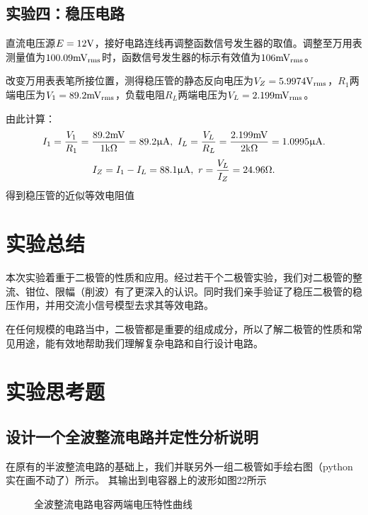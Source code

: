 \documentclass[a4paper,11pt,UTF8]{ctexart}
\begin{document}
	\subsection{实验四：稳压电路}
	直流电压源$E=12\mathrm{V}$，接好电路连线再调整函数信号发生器的取值。调整至万用表测量值为$100.09\mathrm{mV_{rms}}$时，函数信号发生器的标示有效值为$106\mathrm{mV_{rms}}$。
	\par 改变万用表表笔所接位置，测得稳压管的静态反向电压为$V_Z=5.9974\mathrm{V_{rms}}$，$R_1$两端电压为$V_1=89.2\mathrm{mV_{rms}}$，负载电阻$R_L$两端电压为$V_L=2.199\mathrm{mV_{rms}}$。
	\par 由此计算：
	\[ I_1=\frac{V_1}{R_1}=\frac{89.2\mathrm{mV}}{1\mathrm{k}\Omega}=89.2\mathrm{\upmu A},~
	I_L=\frac{V_L}{R_L}=\frac{2.199\mathrm{mV}}{2\mathrm{k}\Omega}=1.0995\mathrm{\upmu A}.
	\]
	\[
	I_Z=I_1-I_L=88.1\mathrm{\upmu A},~r=\frac{V_L}{I_Z}=24.96\Omega.
	\]
	得到稳压管的近似等效电阻值
	
	\section{实验总结}
	本次实验着重于二极管的性质和应用。经过若干个二极管实验，我们对二极管的整流、钳位、限幅（削波）有了更深入的认识。同时我们亲手验证了稳压二极管的稳压作用，并用交流小信号模型去求其等效电路。
	\par 在任何规模的电路当中，二极管都是重要的组成成分，所以了解二极管的性质和常见用途，能有效地帮助我们理解复杂电路和自行设计电路。
	
	\section{实验思考题}
	\subsection{设计一个全波整流电路并定性分析说明}
	在原有的半波整流电路的基础上，我们并联另外一组二极管如手绘右图（python实在画不动了）所示。
	其输出到电容器上的波形如图22所示
	\begin{figure}[H]
		\centering
		\caption{全波整流电路电容两端电压特性曲线}
		\label{fig:additional1}
	\end{figure}
\end{document}
